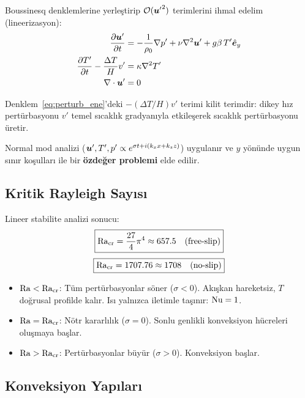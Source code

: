 Boussinesq denklemlerine yerleştirip $\mathcal{O}({\bm{u}'}^2)$ terimlerini ihmal edelim (lineerizasyon):
\begin{subequations}
\begin{align}
    \frac{\partial \bm{u}'}{\partial t} &= -\frac{1}{\rho_0}\nabla p' + \nu\nabla^2\bm{u}' + g\beta\,T'\hat{\bm{e}}_y \label{eq:perturb_mom} \\
    \frac{\partial T'}{\partial t} - \frac{\Delta T}{H}v' &= \kappa\nabla^2 T' \label{eq:perturb_ene} \\
    \nabla \cdot\bm{u}' &= 0 \label{eq:perturb_cont}
\end{align}
\end{subequations}

Denklem~\eqref{eq:perturb_ene}'deki $-(\Delta T/H)v'$ terimi kilit terimdir: dikey hız pertürbasyonu $v'$ temel sıcaklık gradyanıyla etkileşerek sıcaklık pertürbasyonu üretir.

Normal mod analizi ($\bm{u}', T', p' \propto e^{\sigma t + i(k_x x + k_z z)}$) uygulanır ve $y$ yönünde uygun sınır koşulları ile bir \textbf{özdeğer problemi} elde edilir.

\subsection{Kritik Rayleigh Sayısı}

Lineer stabilite analizi sonucu:
\begin{equation}
    \boxed{\mathrm{Ra}_{\text{cr}} = \frac{27}{4}\pi^4 \approx 657.5 \quad \text{(free-slip)}}
    \label{eq:ra_cr_freeslip}
\end{equation}
\begin{equation}
    \boxed{\mathrm{Ra}_{\text{cr}} = 1707.76 \approx 1708 \quad \text{(no-slip)}}
    \label{eq:ra_cr_noslip}
\end{equation}

\begin{itemize}
    \item $\mathrm{Ra} < \mathrm{Ra}_{\text{cr}}$: Tüm pertürbasyonlar söner ($\sigma < 0$). Akışkan hareketsiz, $T$ doğrusal profilde kalır. Isı yalnızca iletimle taşınır: $\mathrm{Nu} = 1$.
    \item $\mathrm{Ra} = \mathrm{Ra}_{\text{cr}}$: Nötr kararlılık ($\sigma = 0$). Sonlu genlikli konveksiyon hücreleri oluşmaya başlar.
    \item $\mathrm{Ra} > \mathrm{Ra}_{\text{cr}}$: Pertürbasyonlar büyür ($\sigma > 0$). Konveksiyon başlar.
\end{itemize}

\subsection{Konveksiyon Yapıları}

